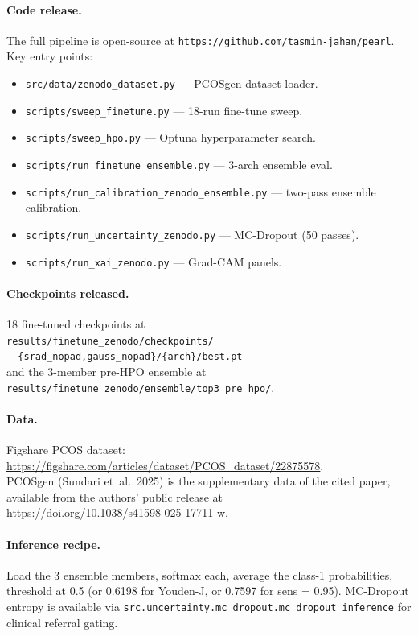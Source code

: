 \documentclass[11pt,twocolumn]{article}
\newcommand{\PCOS}{PCOS}
\newcommand{\GradCAM}{Grad-CAM}
\begin{document}
\paragraph{Code release.}
The full pipeline is open-source at
\texttt{https://github.com/tasmin-jahan/pearl}.
Key entry points:
\begin{itemize}[leftmargin=*,noitemsep,topsep=2pt]
  \item \texttt{src/data/zenodo\_dataset.py} --- \PCOS{}gen dataset
        loader.
  \item \texttt{scripts/sweep\_finetune.py} --- 18-run fine-tune sweep.
  \item \texttt{scripts/sweep\_hpo.py} --- Optuna hyperparameter search.
  \item \texttt{scripts/run\_finetune\_ensemble.py} --- 3-arch ensemble
        eval.
  \item \texttt{scripts/run\_calibration\_zenodo\_ensemble.py} --- two-pass
        ensemble calibration.
  \item \texttt{scripts/run\_uncertainty\_zenodo.py} --- MC-Dropout (50
        passes).
  \item \texttt{scripts/run\_xai\_zenodo.py} --- \GradCAM{} panels.
\end{itemize}

\paragraph{Checkpoints released.}
18 fine-tuned checkpoints at \\
\texttt{results/finetune\_zenodo/checkpoints/} \\
\texttt{\ \ \{srad\_nopad,gauss\_nopad\}/\{arch\}/best.pt} \\
and the 3-member pre-HPO ensemble at \\
\texttt{results/finetune\_zenodo/ensemble/top3\_pre\_hpo/}.

\paragraph{Data.}
Figshare \PCOS{} dataset: \\
\url{https://figshare.com/articles/dataset/PCOS_dataset/22875578}. \\
\PCOS{}gen (Sundari et~al.\ 2025) is the supplementary data of the cited
paper, available from the authors' public release at \\
\url{https://doi.org/10.1038/s41598-025-17711-w}.

\paragraph{Inference recipe.}
Load the 3 ensemble members, softmax each, average the class-1
probabilities, threshold at 0.5 (or 0.6198 for Youden-J, or 0.7597 for
sens = 0.95). MC-Dropout entropy is available via
\texttt{src.uncertainty.mc\_dropout.mc\_dropout\_inference} for clinical
referral gating.
\end{document}

